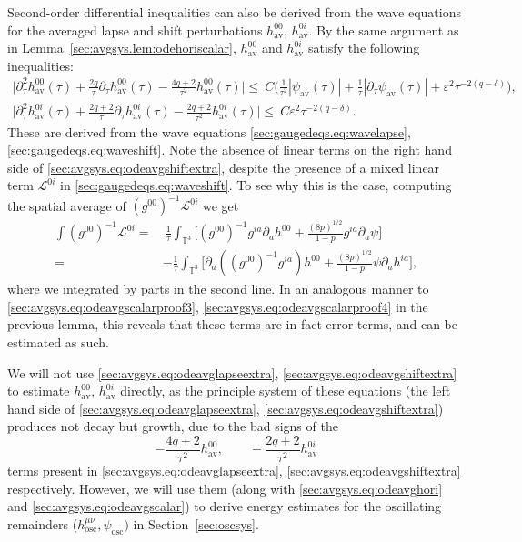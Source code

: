 \documentclass{article}
\newcommand{\TT}{\mathbb{T}}
\newcommand{\osc}{\mathrm{osc}}
\newcommand{\av}{\mathrm{av}}
\newcommand{\mc}{\mathcal}
\newcommand{\ve}{\varepsilon}
\newcommand{\pa}{\partial}
\begin{document}
\begin{remark}\label{sec:avgsys.rmk:odelapseshiftextra}
    Second-order differential inequalities can also be derived from the wave equations for the averaged lapse and shift perturbations $h_{\av}^{00}$, $h_{\av}^{0i}$. By the same argument as in Lemma~\ref{sec:avgsys.lem:odehoriscalar}, $h_{\av}^{00}$ and $h_{\av}^{0i}$ satisfy the following inequalities:
    \begin{subequations}
        \begin{gather}
            \Big|\pa_\tau^2 h_{\av}^{00}(\tau) + \frac{2q}{\tau}\pa_\tau h_{\av}^{00} (\tau) - \frac{4q+2}{\tau^2}h_{\av}^{00}(\tau)\Big| \leq\>C\Big(\frac{1}{\tau^2}|\psi_{\av}(\tau)|+\frac{1}{\tau}|\pa_\tau \psi_{\av}(\tau)|+\ve^2 \tau^{-2(q-\delta)}\Big),\label{sec:avgsys.eq:odeavglapseextra}\\
            \Big|\pa_\tau^2 h_{\av}^{0i}(\tau) + \frac{2q+2}{\tau}\pa_\tau h_{\av}^{0i} (\tau) - \frac{2q+2}{\tau^2}h_{\av}^{0i}(\tau)\Big| \leq\>C\ve^2 \tau^{-2(q-\delta)}.\label{sec:avgsys.eq:odeavgshiftextra}
        \end{gather}
    \end{subequations}
    These are derived from the wave equations \eqref{sec:gaugedeqs.eq:wavelapse}, \eqref{sec:gaugedeqs.eq:waveshift}. Note the absence of linear terms on the right hand side of \eqref{sec:avgsys.eq:odeavgshiftextra}, despite the presence of a mixed linear term $\mc{L}^{0i}$ in \eqref{sec:gaugedeqs.eq:waveshift}. To see why this is the case, computing the spatial average of $(g^{00})^{-1}\mc{L}^{0i}$ we get
    \begin{align}
        \int(g^{00})^{-1}\mc{L}^{0i}= &\>\frac{1}{\tau}\int_{\TT^3}\Big[(g^{00})^{-1}g^{ia}\pa_a h^{00} + \frac{(8p)^{1/2}}{1-p}g^{ia}\pa_a \psi\Big]\nonumber\\
        =&-\frac{1}{\tau}\int_{\TT^3}\Big[\pa_a((g^{00})^{-1} g^{ia})h^{00} + \frac{(8p)^{1/2}}{1-p} \psi\pa_a h^{ia}\Big],
    \end{align}
    where we integrated by parts in the second line. In an analogous manner to \eqref{sec:avgsys.eq:odeavgscalarproof3}, \eqref{sec:avgsys.eq:odeavgscalarproof4} in the previous lemma, this reveals that these terms are in fact error terms, and can be estimated as such.

    We will not use \eqref{sec:avgsys.eq:odeavglapseextra}, \eqref{sec:avgsys.eq:odeavgshiftextra} to estimate $h_{\av}^{00}$, $h_{\av}^{0i}$ directly, as the principle system of these equations (the left hand side of \eqref{sec:avgsys.eq:odeavglapseextra}, \eqref{sec:avgsys.eq:odeavgshiftextra}) produces not decay but growth, due to the bad signs of the
    \begin{equation}
        -\frac{4q+2}{\tau^2}h_{\av}^{00},\qquad -\frac{2q+2}{\tau^2}h_{\av}^{0i}
    \end{equation}
    terms present in \eqref{sec:avgsys.eq:odeavglapseextra}, \eqref{sec:avgsys.eq:odeavgshiftextra} respectively. However, we will use them  (along with \eqref{sec:avgsys.eq:odeavghori} and \eqref{sec:avgsys.eq:odeavgscalar}) to derive energy estimates for the oscillating remainders ($h_{\osc}^{\mu\nu},\psi_\osc)$ in Section~\ref{sec:oscsys}.
\end{remark}
\end{document}
